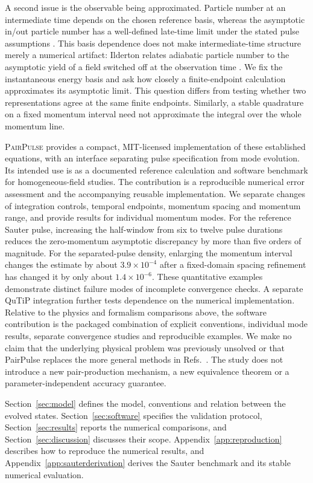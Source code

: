 \documentclass[11pt,a4paper]{article}
\newcommand{\PairPulse}{\textsc{PairPulse}}
\begin{document}
A second issue is the observable being approximated. Particle number at an intermediate time depends on the chosen reference basis, whereas the asymptotic in/out particle number has a well-defined late-time limit under the stated pulse assumptions \cite{Dabrowski2016}. This basis dependence does not make intermediate-time structure merely a numerical artifact: Ilderton relates adiabatic particle number to the asymptotic yield of a field switched off at the observation time \cite{Ilderton2022}. We fix the instantaneous energy basis and ask how closely a finite-endpoint calculation approximates its asymptotic limit. This question differs from testing whether two representations agree at the same finite endpoints. Similarly, a stable quadrature on a fixed momentum interval need not approximate the integral over the whole momentum line.

\PairPulse{} provides a compact, MIT-licensed implementation of these established equations, with an interface separating pulse specification from mode evolution. Its intended use is as a documented reference calculation and software benchmark for homogeneous-field studies. The contribution is a reproducible numerical error assessment and the accompanying reusable implementation. We separate changes of integration controls, temporal endpoints, momentum spacing and momentum range, and provide results for individual momentum modes. For the reference Sauter pulse, increasing the half-window from six to twelve pulse durations reduces the zero-momentum asymptotic discrepancy by more than five orders of magnitude. For the separated-pulse density, enlarging the momentum interval changes the estimate by about $3.9\times10^{-4}$ after a fixed-domain spacing refinement has changed it by only about $1.4\times10^{-6}$. These quantitative examples demonstrate distinct failure modes of incomplete convergence checks. A separate QuTiP integration further tests dependence on the numerical implementation. Relative to the physics and formalism comparisons above, the software contribution is the packaged combination of explicit conventions, individual mode results, separate convergence studies and reproducible examples. We make no claim that the underlying physical problem was previously unsolved or that PairPulse replaces the more general methods in Refs.~\cite{LiGong2021,Aleksandrov2024,Majczak2024}. The study does not introduce a new pair-production mechanism, a new equivalence theorem or a parameter-independent accuracy guarantee.

Section~\ref{sec:model} defines the model, conventions and relation between the evolved states. Section~\ref{sec:software} specifies the validation protocol, Section~\ref{sec:results} reports the numerical comparisons, and Section~\ref{sec:discussion} discusses their scope. Appendix~\ref{app:reproduction} describes how to reproduce the numerical results, and Appendix~\ref{app:sauterderivation} derives the Sauter benchmark and its stable numerical evaluation.
\end{document}
